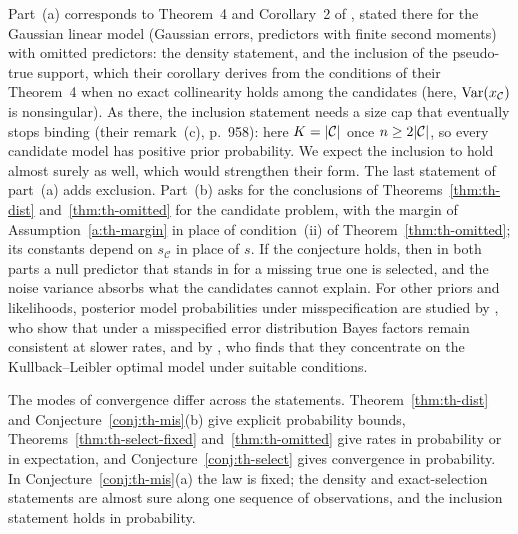 Part~(a) corresponds to Theorem~4 and Corollary~2 of \citet{SongLiang2015}, stated there for the Gaussian linear model (Gaussian errors, predictors with finite second moments) with
omitted predictors: the density statement, and the inclusion of the pseudo-true support, which their corollary
derives from the conditions of their Theorem~4 when no exact collinearity holds among the candidates (here,
$\operatorname{Var}(x_{\mathcal C})$ is nonsingular). As there, the inclusion statement needs a size cap that eventually stops
binding (their remark~(c), p.~958): here $K=\lvert \mathcal C\rvert$ once $n\ge2\lvert \mathcal C\rvert$, so every candidate model
has positive prior probability. We expect the inclusion to hold almost surely as well, which would strengthen their
form. The last statement of part~(a) adds exclusion. Part~(b) asks for the
conclusions of Theorems~\ref{thm:th-dist} and~\ref{thm:th-omitted} for the candidate problem, with the margin of
Assumption~\ref{a:th-margin} in place of condition~(ii) of Theorem~\ref{thm:th-omitted}; its constants depend on
$s_{\mathcal C}$ in place of $s$. If the conjecture holds, then in both parts a null predictor that stands in for a
missing true one is selected, and the noise variance absorbs what the candidates cannot explain. For other priors and likelihoods, posterior model probabilities
under misspecification are studied by \citet{RossellRubio2018}, who show that under a misspecified error distribution
Bayes factors remain consistent at slower rates, and by \citet{Rossell2022}, who finds that they concentrate on the
Kullback--Leibler optimal model under suitable conditions.

The modes of convergence differ across the statements. Theorem~\ref{thm:th-dist} and
Conjecture~\ref{conj:th-mis}(b) give explicit probability bounds, Theorems~\ref{thm:th-select-fixed}
and~\ref{thm:th-omitted} give rates in probability or in expectation, and Conjecture~\ref{conj:th-select} gives
convergence in probability. In Conjecture~\ref{conj:th-mis}(a) the law is fixed; the density and exact-selection statements are almost sure
along one sequence of observations, and the inclusion statement holds in probability.


